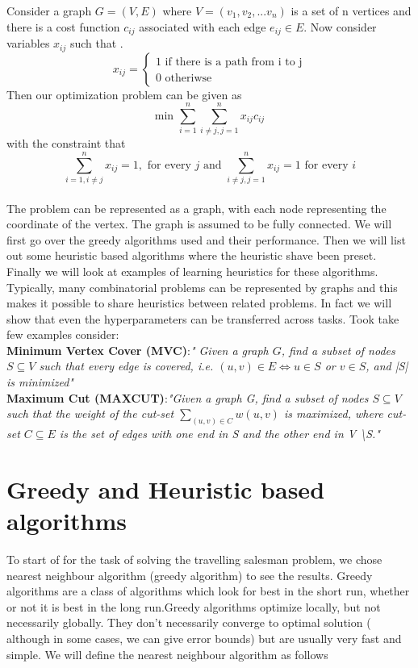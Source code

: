 \documentclass{article}
\theoremstyle{definition}
\begin{document}
Consider a graph $G= (V,E) $ where $V = (v_1, v_2, ...v_n)$ is a set of n vertices and there is a cost function $c_{ij}$ associated with each edge $e_{ij} \in E$. Now consider variables $x_{ij}$ such that .
$$ 
x_{ij} =
\begin{cases}
    1 \text{  if there is a path from i to j}\\    
 0  \text{  otheriwse}
\end{cases} $$
Then our optimization problem can be given as 
$$ \text{min } \sum_{i=1}^n  \sum_{i \neq j,j=1}^n x_{ij}c_{ij}$$
with the constraint that 
$$  \sum_{i=1,i \neq j}^n x_{ij}=1, \text{ for every $j$ and }  \sum_{i \neq j,j=1}^n x_{ij}=1  \text{ for every $i$} $$
\\
The problem can be represented as a graph, with each node representing the coordinate of the vertex. The graph is assumed to be fully connected. We will first go over the greedy algorithms used and their performance. Then we will list out some heuristic based algorithms where the heuristic shave been preset. Finally we will look at examples of learning heuristics for these algorithms. \\
Typically, many combinatorial problems can be represented by graphs and this makes it possible to share heuristics between related problems. In fact we will show that even the hyperparameters can be transferred across tasks. Took take few examples consider:\\


\textbf{Minimum Vertex Cover (MVC)}:\emph{" Given a graph $G$, find a subset of nodes $S \subseteq V$ such that every edge is covered, i.e. $(u, v) \in E \iff u \in S$ or $v \in S$, and |S| is minimized"}\\

\textbf{Maximum Cut (MAXCUT)}:\emph{"Given a graph G, find a subset of nodes $S\subseteq V$ such that the weight
of the cut-set $\sum\limits_{(u,v) \in C} w(u, v)$ is maximized, where cut-set $ C \subseteq E$  is the set of edges with one
end in S and the other end in V \textbackslash S."}\\


\section{Greedy and Heuristic based algorithms}
To start of for the task of solving the travelling salesman problem, we chose nearest neighbour algorithm (greedy algorithm) to see the results. Greedy algorithms are a class of algorithms which look for best in the short run, whether or not it is best in the long run.Greedy algorithms optimize locally, but not necessarily globally. They don't necessarily converge to optimal solution ( although in some cases, we can give error bounds) but are usually very fast and simple. We will define the nearest neighbour algorithm as follows\\
\end{document}
